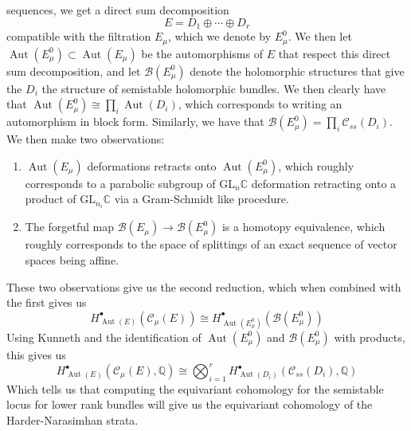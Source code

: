 \documentclass[psamsfonts, 12pt]{amsart}
\theoremstyle{definition}
\theoremstyle{remark}
\newcommand{\Q}{\mathbb{Q}}
\newcommand{\C}{\mathbb{C}}
\newcommand{\GL}{\mathrm{GL}}
\DeclareMathOperator{\Aut}{Aut}
\begin{document}
sequences, we get a direct sum decomposition
\[
E = D_1 \oplus \cdots \oplus D_r
\]
compatible with the filtration $E_\mu$, which we denote by $E_\mu^0$. We
then let $\Aut(E_\mu^0) \subset \Aut(E_\mu)$ be the automorphisms of $E$ that
respect this direct sum decomposition, and let $\mathscr{B}(E_\mu^0)$ denote
the holomorphic structures that give the $D_i$ the structure of semistable
holomorphic bundles. We then clearly have that $\Aut(E^0_\mu) \cong \prod_i\Aut(D_i)$,
which corresponds to writing an automorphism in block form. Similarly, we
have that $\mathscr{B}(E_\mu^0) = \prod_i\mathscr{C}_{ss}(D_i)$. We then make
two observations:
\begin{enumerate}
  \item $\Aut(E_\mu)$ deformations retracts onto $\Aut(E^0_\mu)$, which
  roughly corresponds to a parabolic subgroup of $\GL_n\C$ deformation retracting
  onto a product of $\GL_{n_i}\C$ via a Gram-Schmidt like procedure.
  \item The forgetful map $\mathscr{B}(E_\mu) \to \mathscr{B}(E_\mu^0)$ is a
  homotopy equivalence, which roughly corresponds to the space of splittings
  of an exact sequence of vector spaces being affine.
\end{enumerate}
%
These two observations give us the second reduction, which when combined with the first
gives us
\[
H^\bullet_{\Aut(E)}(\mathscr{C}_\mu(E)) \cong
H^\bullet_{\Aut(E_\mu^0)}(\mathscr{B}(E_\mu^0))
\]
Using Kunneth and the identification of $\Aut(E_\mu^0)$ and $\mathscr{B}(E_\mu^0)$
with products, this gives us
\[
H^\bullet_{\Aut(E)}(\mathscr{C}_\mu(E),\Q) \cong
\bigotimes_{i=1}^r H^\bullet_{\Aut(D_i)}(\mathscr{C}_{ss}(D_i),\Q)
\]
Which tells us that computing the equivariant cohomology for the semistable
locus for lower rank bundles will give us the equivariant cohomology of
the Harder-Narasimhan strata. \\
\end{document}
